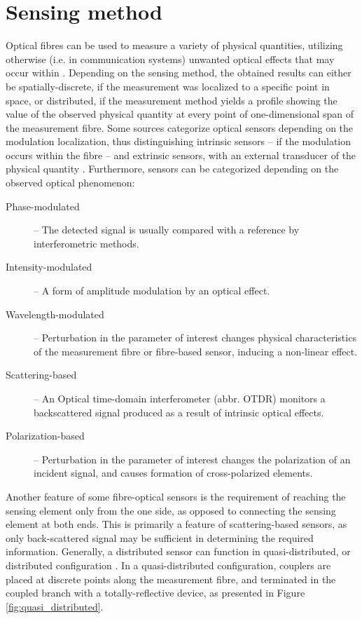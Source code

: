 \documentclass{standalone}
\begin{document}
\chapter{Sensing method} \label{ch:sensing_method}
\setcounter{page}\thestranica


Optical fibres can be used to measure a variety of physical quantities, utilizing otherwise (i.e. in communication systems) unwanted optical effects that may occur within \cite{krohnFundamentals}. Depending on the sensing method, the obtained results can either be spatially-discrete, if the measurement was localized to a specific point in space, or distributed, if the measurement method yields a profile showing the value of the observed physical quantity at every point of one-dimensional span of the measurement fibre. Some sources categorize optical sensors depending on the modulation localization, thus distinguishing intrinsic sensors -- if the modulation occurs within the fibre -- and extrinsic sensors, with an external transducer of the physical quantity \cite{mitschke2010fiber}. Furthermore, sensors can be categorized depending on the observed optical phenomenon:
\begin{description}
	\item[Phase-modulated] -- The detected signal is usually compared with a reference by interferometric methods.
	\item[Intensity-modulated] -- A form of amplitude modulation by an optical effect.
	\item[Wavelength-modulated] -- Perturbation in the parameter of interest changes physical characteristics of the measurement fibre or fibre-based sensor, inducing a non-linear effect.
	\item[Scattering-based] -- An Optical time-domain interferometer (abbr. OTDR) monitors a backscattered signal produced as a result of intrinsic optical effects.
	\item[Polarization-based] -- Perturbation in the parameter of interest changes the polarization of an incident signal, and causes formation of cross-polarized elements.
\end{description}
Another feature of some fibre-optical sensors is the requirement of reaching the sensing element only from the one side, as opposed to connecting the sensing element at both ends. This is primarily a feature of scattering-based sensors, as only back-scattered signal may be sufficient in determining the required information. Generally, a distributed sensor can function in quasi-distributed, or distributed configuration \cite{Rogers1999}. In a quasi-distributed configuration, couplers are placed at discrete points along the measurement fibre, and terminated in the coupled branch with a totally-reflective device, as presented in Figure \ref{fig:quasi_distributed}.
\end{document}
